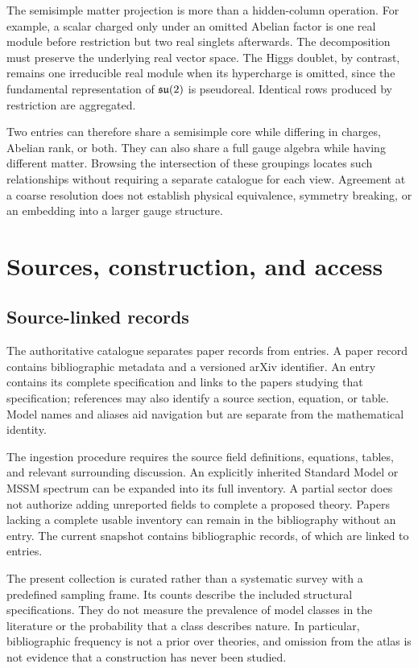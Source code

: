 The semisimple matter projection is more than a hidden-column operation. For example, a scalar charged only under an omitted Abelian factor is one real module before restriction but two real singlets afterwards. The decomposition must preserve the underlying real vector space. The Higgs doublet, by contrast, remains one irreducible real module when its hypercharge is omitted, since the fundamental representation of $\mathfrak{su}(2)$ is pseudoreal. Identical rows produced by restriction are aggregated.

Two entries can therefore share a semisimple core while differing in charges, Abelian rank, or both. They can also share a full gauge algebra while having different matter. Browsing the intersection of these groupings locates such relationships without requiring a separate catalogue for each view. Agreement at a coarse resolution does not establish physical equivalence, symmetry breaking, or an embedding into a larger gauge structure.

\section{Sources, construction, and access}
\label{sec:construction}

\subsection{Source-linked records}

The authoritative catalogue separates paper records from entries. A paper record contains bibliographic metadata and a versioned arXiv identifier. An entry contains its complete specification and links to the papers studying that specification; references may also identify a source section, equation, or table. Model names and aliases aid navigation but are separate from the mathematical identity.

The ingestion procedure requires the source field definitions, equations, tables, and relevant surrounding discussion. An explicitly inherited Standard Model or MSSM spectrum can be expanded into its full inventory. A partial sector does not authorize adding unreported fields to complete a proposed theory. Papers lacking a complete usable inventory can remain in the bibliography without an entry. The current snapshot contains \AtlasPapers{} bibliographic records, of which \AtlasLinkedPapers{} are linked to entries.

The present collection is curated rather than a systematic survey with a predefined sampling frame. Its counts describe the included structural specifications. They do not measure the prevalence of model classes in the literature or the probability that a class describes nature. In particular, bibliographic frequency is not a prior over theories, and omission from the atlas is not evidence that a construction has never been studied.

